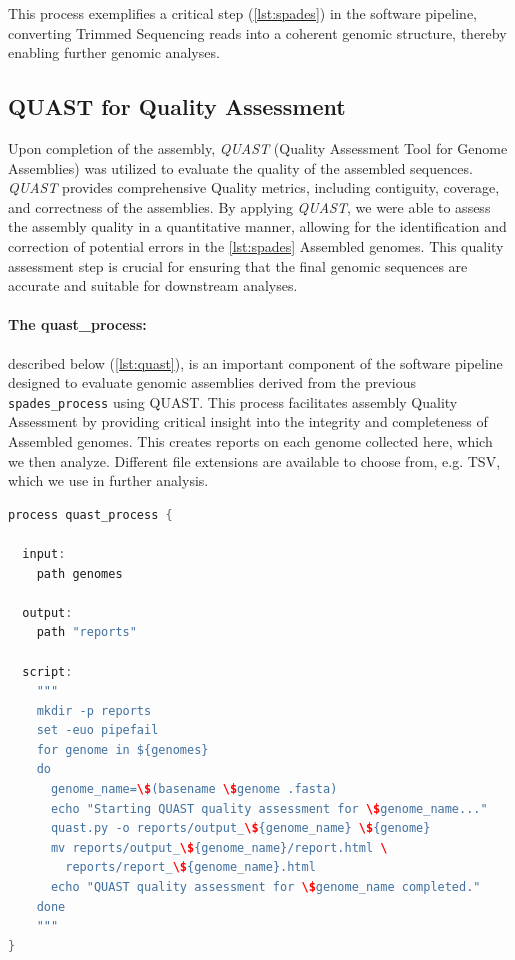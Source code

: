 This process exemplifies a critical step (\autoref{lst:spades}) in the software pipeline, converting Trimmed Sequencing \gls{read}s into a coherent genomic structure, thereby enabling further genomic analyses.


\subsection{QUAST for Quality Assessment}
Upon completion of the \gls{assembly}, \textit{QUAST} (Quality Assessment Tool for Genome Assemblies) was utilized to evaluate the quality of the assembled sequences. \textit{QUAST} provides comprehensive Quality \gls{metrics}, including contiguity, coverage, and correctness of the assemblies. By applying \textit{QUAST}, we were able to assess the assembly quality in a quantitative manner, allowing for the identification and correction of potential errors in the \autoref{lst:spades} Assembled \gls{genome}s. This quality assessment step is crucial for ensuring that the final genomic sequences are accurate and suitable for downstream analyses.

\paragraph{The quast\_process:}

described below (\autoref{lst:quast}), is an important component of the software pipeline designed to evaluate genomic assemblies derived from the previous \texttt{spades\_process} using QUAST. This process facilitates \gls{assembly} Quality Assessment by providing critical insight into the integrity and completeness of Assembled \gls{genome}s. This creates reports on each \gls{genome} collected here, which we then analyze. Different file extensions are available to choose from, e.g. TSV, which we use in further analysis.

\begin{lstlisting}[language=Java, label={lst:quast}, caption={QUAST quality assessment process in Nextflow.}]
process quast_process {

  input:
    path genomes

  output:
    path "reports"

  script:
    """
    mkdir -p reports
    set -euo pipefail
    for genome in ${genomes}
    do
      genome_name=\$(basename \$genome .fasta)
      echo "Starting QUAST quality assessment for \$genome_name..."
      quast.py -o reports/output_\${genome_name} \${genome}
      mv reports/output_\${genome_name}/report.html \
        reports/report_\${genome_name}.html
      echo "QUAST quality assessment for \$genome_name completed."
    done
    """
}
\end{lstlisting}

